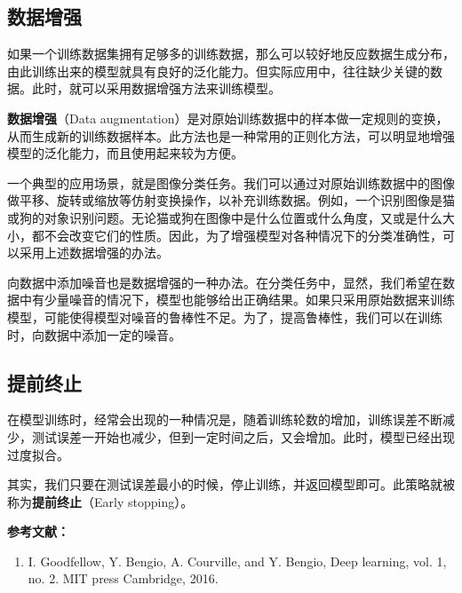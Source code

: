 \subsection{数据增强}

如果一个训练数据集拥有足够多的训练数据，那么可以较好地反应数据生成分布，由此训练出来的模型就具有良好的泛化能力。但实际应用中，往往缺少关键的数据。此时，就可以采用数据增强方法来训练模型。

\textbf{数据增强}（Data augmentation）是对原始训练数据中的样本做一定规则的变换，从而生成新的训练数据样本。此方法也是一种常用的正则化方法，可以明显地增强模型的泛化能力，而且使用起来较为方便。

一个典型的应用场景，就是图像分类任务。我们可以通过对原始训练数据中的图像做平移、旋转或缩放等仿射变换操作，以补充训练数据。例如，一个识别图像是猫或狗的对象识别问题。无论猫或狗在图像中是什么位置或什么角度，又或是什么大小，都不会改变它们的性质。因此，为了增强模型对各种情况下的分类准确性，可以采用上述数据增强的办法。

向数据中添加噪音也是数据增强的一种办法。在分类任务中，显然，我们希望在数据中有少量噪音的情况下，模型也能够给出正确结果。如果只采用原始数据来训练模型，可能使得模型对噪音的鲁棒性不足。为了，提高鲁棒性，我们可以在训练时，向数据中添加一定的噪音。


\subsection{提前终止}

在模型训练时，经常会出现的一种情况是，随着训练轮数的增加，训练误差不断减少，测试误差一开始也减少，但到一定时间之后，又会增加。此时，模型已经出现过度拟合。

其实，我们只要在测试误差最小的时候，停止训练，并返回模型即可。此策略就被称为\textbf{提前终止}（Early stopping）。


\textbf{参考文献：}
\begin{enumerate}
\item I. Goodfellow, Y. Bengio, A. Courville, and Y. Bengio, Deep learning, vol. 1, no. 2. MIT press Cambridge, 2016.
\end{enumerate}

